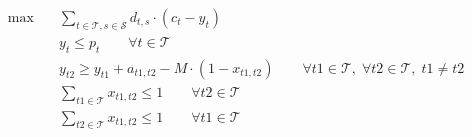 \begin{align}
  \max\quad & \sum_{t \in \mathcal{T}, s \in \mathcal{S}} d_{t,s} \cdot (c_t - y_t) \tag{consumer\_satisfaction} \\
  & y_t \le p_t \qquad \forall t \in \mathcal{T} \tag{delay\_constraint} \\
  & y_{t2} \ge y_{t1} + a_{t1,t2} - \mathit{M} \cdot (1 - x_{t1,t2}) \qquad \forall t1 \in \mathcal{T},\; \forall t2 \in \mathcal{T},\; t1 \neq t2 \tag{rescheduling\_constraint} \\
  & \sum_{t1 \in \mathcal{T}} x_{t1,t2} \le 1 \qquad \forall t2 \in \mathcal{T} \tag{rescheduling\_constraint} \\
  & \sum_{t2 \in \mathcal{T}} x_{t1,t2} \le 1 \qquad \forall t1 \in \mathcal{T} \tag{rescheduling\_constraint} \\
\end{align}